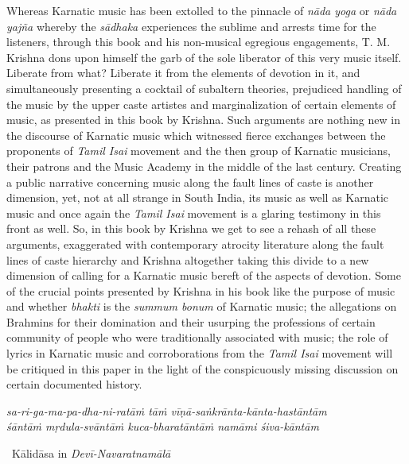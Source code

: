 Whereas Karnatic music has been extolled to the pinnacle of \textit{nāda yoga} or \textit{nāda yajña} whereby the \textit{sādhaka} experiences the sublime and arrests time for the listeners, through this book and his non-musical egregious engagements, T. M. Krishna dons upon himself the garb of the sole liberator of this very music itself. Liberate from what? Liberate it from the elements of devotion in it, and simultaneously presenting a cocktail of subaltern theories, prejudiced handling of the music by the upper caste artistes and marginalization of certain elements of music, as presented in this book by Krishna. Such arguments are nothing new in the discourse of Karnatic music which witnessed fierce exchanges between the proponents of \textit{Tamil Isai} movement and the then group of Karnatic musicians, their patrons and the Music Academy in the middle of the last century. Creating a public narrative concerning music along the fault lines of caste is another dimension, yet, not at all strange in South India, its music as well as Karnatic music and once again the \textit{Tamil Isai} movement is a glaring testimony in this front as well. So, in this book by Krishna we get to see a rehash of all these arguments, exaggerated with contemporary atrocity literature along the fault lines of caste hierarchy and Krishna altogether taking this divide to a new dimension of calling for a Karnatic music bereft of the aspects of devotion. Some of the crucial points presented by Krishna in his book like the purpose of music and whether \textit{bhakti} is the \textit{summum bonum} of Karnatic music; the allegations on Brahmins for their domination and their usurping the professions of certain community of people who were traditionally associated with music; the role of lyrics in Karnatic music and corroborations from the \textit{Tamil Isai} movement will be critiqued in this paper in the light of the conspicuously missing discussion on certain documented history.

\begin{myquote}
\textit{sa-ri-ga-ma-pa-dha-ni-ratāṁ tāṁ vīṇā-saṅkrānta-kānta-hastāntām }\\ \textit{śāntāṁ mṛdula-svāntāṁ kuca-bharatāntāṁ namāmi śiva-kāntām} 

~\hfill Kālidāsa in \textit{Devī-Navaratnamālā}
\end{myquote}

